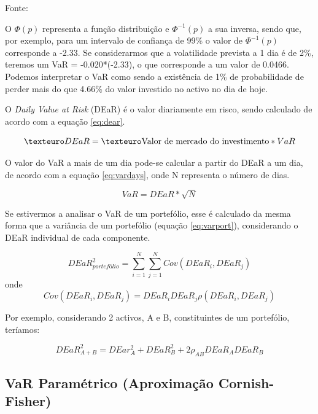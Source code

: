 \documentclass[
  12pt,
  a4paper,
  openany]{book}
\theoremstyle{definition}
\theoremstyle{definition}
\theoremstyle{definition}
\theoremstyle{remark}
\begin{document}
Fonte: \citep[pp.13]{phdthesis}

\justifying
\bigskip

O \(\Phi (p)\) representa a função distribuição e \(\Phi^{-1} (p)\) a sua inversa, sendo que, por exemplo, para um intervalo de confiança de 99\% o valor de \(\Phi^{-1} (p)\) corresponde a -2.33. Se considerarmos que a volatilidade prevista a 1 dia é de 2\%, teremos um VaR = -0.020*(-2.33), o que corresponde a um valor de 0.0466. Podemos interpretar o VaR como sendo a existência de 1\% de probabilidade de perder mais do que 4.66\% do valor investido no activo no dia de hoje.

O \emph{Daily Value at Risk} (DEaR) é o valor diariamente em risco, sendo calculado de acordo com a equação \eqref{eq:dear}.

\begin{equation} 
  €DEaR = € \textnormal{Valor de mercado do investimento} * VaR
  \label{eq:dear}  
\end{equation}

O valor do VaR a mais de um dia pode-se calcular a partir do DEaR a um dia, de acordo com a equação \eqref{eq:vardays}, onde N representa o número de dias.

\begin{equation} 
  VaR = DEaR*\sqrt{N}
  \label{eq:vardays}
\end{equation}

Se estivermos a analisar o VaR de um portefólio, esse é calculado da mesma forma que a variância de um portefólio (equação \eqref{eq:varport}), considerando o DEaR individual de cada componente.

\begin{equation} 
  DEaR_{portefólio}^{2} = \sum_{i=1}^{N}\sum_{j=1}^{N}Cov(DEaR_i,DEaR_j)
  \label{eq:varport}
\end{equation}
onde
\begin{equation} 
  Cov(DEaR_i,DEaR_j) = DEaR_{i}DEaR_{j}\rho(DEaR_i,DEaR_j)
  \label{eq:covport}
\end{equation}

Por exemplo, considerando 2 activos, A e B, constituintes de um portefólio, teríamos:

\begin{equation} 
  DEaR_{A+B}^{2} = DEar_{A}^{2}+DEaR_{B}^{2}+2\rho_{AB} DEaR_{A} DEaR_B
  \label{eq:ab}
\end{equation}

\hypertarget{var-paramuxe9trico-aproximauxe7uxe3o-cornish-fisher}{%
\subsection{VaR Paramétrico (Aproximação Cornish-Fisher)}\label{var-paramuxe9trico-aproximauxe7uxe3o-cornish-fisher}}
\end{document}
